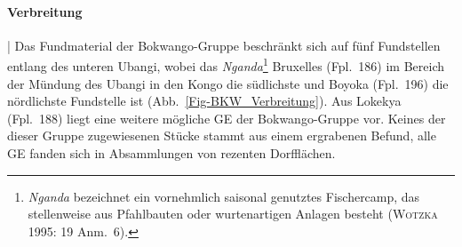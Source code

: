\paragraph{Verbreitung}\hspace{-.5em}|\hspace{.5em}%
Das Fundmaterial der Bokwango-Gruppe beschränkt sich auf fünf Fundstellen entlang des unteren \mbox{Ubangi}, wobei das \textit{Nganda}\footnote{\textit{Nganda} bezeichnet ein vornehmlich saisonal genutztes Fischercamp, das stellenweise aus Pfahlbauten oder wurtenartigen Anlagen besteht (\textsc{Wotzka} 1995: 19 Anm.~6).\label{ftn:Nganda}} Bruxelles (Fpl.~186) im Bereich der Mündung des \mbox{Ubangi} in den Kongo die südlichste und Boyoka (Fpl.~196) die nördlichste Fundstelle ist (Abb.~\ref{Fig-BKW_Verbreitung}). Aus Lokekya (Fpl.~188) liegt eine weitere mögliche GE der Bokwango-Gruppe vor. Keines der dieser Gruppe zugewiesenen Stücke stammt aus einem ergrabenen Befund, alle GE fanden sich in Absammlungen von rezenten Dorfflächen.